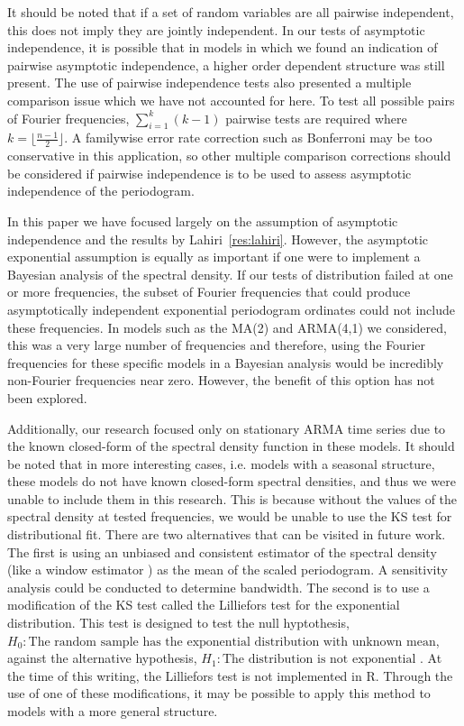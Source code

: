 \documentclass{article}\usepackage{graphicx, color}
\theoremstyle{plain}
\begin{document}
It should be noted that if a set of random variables are all pairwise independent, this does not imply they are jointly independent. In our tests of asymptotic independence, it is possible that in models in which we found an indication of pairwise asymptotic independence, a higher order dependent structure was still present. The use of pairwise independence tests also presented a multiple comparison issue which we have not accounted for here. To test all possible pairs of Fourier frequencies, $\sum_{i=1}^k (k-1)$ pairwise tests are required where $k=\lfloor\frac{n-1}{2}\rfloor$. A familywise error rate correction such as Bonferroni may be too conservative in this application, so other multiple comparison corrections should be considered if pairwise independence is to be used to assess asymptotic independence of the periodogram.

In this paper we have focused largely on the assumption of asymptotic independence and the results by Lahiri~\ref{res:lahiri}. However, the asymptotic exponential assumption is equally as important if one were to implement a Bayesian analysis of the spectral density. If our tests of distribution failed at one or more frequencies, the subset of Fourier frequencies that could produce asymptotically independent exponential periodogram ordinates could not include these frequencies. In models such as the MA(2) and ARMA(4,1) we considered, this was a very large number of frequencies and therefore, using the Fourier frequencies for these specific models in a Bayesian analysis would be incredibly non-Fourier frequencies near zero. However, the benefit of this option has not been explored.

Additionally, our research focused only on stationary ARMA time series due to the known closed-form of the spectral density function in these models. It should be noted that in more interesting cases, i.e. models with a seasonal structure, these models do not have known closed-form spectral densities, and thus we were unable to include them in this research. This is because without the values of the spectral density at tested frequencies, we would be unable to use the KS test for distributional fit. There are two alternatives that can be visited in future work. The first is using an unbiased and consistent estimator of the spectral density (like a window estimator \cite{brockwell2002introduction}) as the mean of the scaled periodogram. A sensitivity analysis could be conducted to determine bandwidth. The second is to use a modification of the KS test called the Lilliefors test for the exponential distribution. This test is designed to test the null hyptothesis, $H_0: \text{The random sample has the exponential distribution with unknown mean}$, against the alternative hypothesis, $H_1: \text{The distribution is not exponential}$ \cite{conover1998practical}. At the time of this writing, the Lilliefors test is not implemented in R. Through the use of one of these modifications, it may be possible to apply this method to models with a more general structure.
\end{document}
